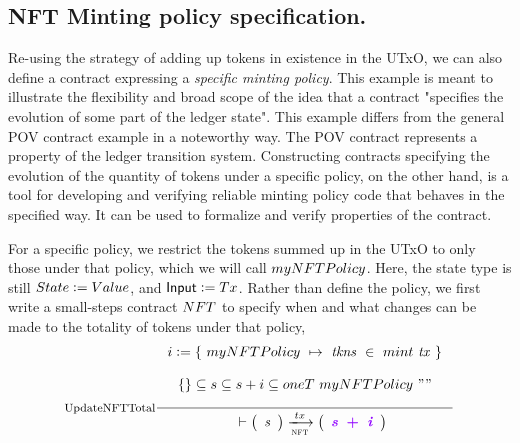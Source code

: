 \subsection{NFT Minting policy specification.}
\label{sec:mit-example}

Re-using the strategy of adding up tokens in existence in the UTxO, we
can also define a contract expressing a \emph{specific minting policy}.
This example is meant to illustrate the flexibility and broad scope of the idea that
a contract "specifies the evolution of some part of the ledger state".
This example differs from the general POV contract example in a
noteworthy way. The POV contract represents a property of the ledger transition system.
Constructing contracts specifying the evolution of the quantity of tokens
under a specific policy, on the
other hand, is a tool for developing and verifying reliable minting policy code that behaves in
the specified way. It can be used to formalize and verify properties of the contract.

For a specific policy, we restrict the tokens summed up in the UTxO to
only those under that policy, which we will call $\fun{myNFTPolicy}$.
Here, the state type is still $\State \leteq \Value$, and $\Input \leteq \Tx$.
Rather than define the policy, we first write a small-steps contract $\fun{NFT}$
to specify when and what changes can be made to the totality of tokens
under that policy,
\begin{equation}
  \inference[UpdateNFTTotal]
  {
  i \leteq \{~\fun{myNFTPolicy}~\mapsto~\var{tkns}~\in~ \fun{mint}~\var{tx}~\} \\~\\
  \{\} \subseteq s \subseteq s + i \subseteq \fun{oneT}~\fun{myNFTPolicy}~""
  \\ ~ \\
  }
  {
  \begin{array}{l}
    \\
  \end{array}
    \vdash
    \left(
    \begin{array}{r}
      \var{s} \\
    \end{array}
    \right)
    \trans{nft}{tx}
    \left(
    \begin{array}{r}
      \varUpdate{\var{s}~+~\var{i}}  \\
    \end{array}
    \right) \\
  }
\end{equation}

